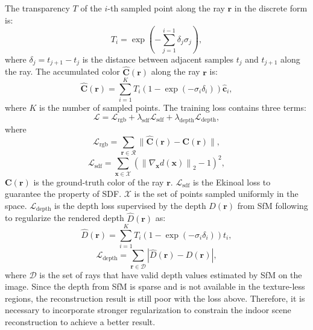 \documentclass[10pt,journal,compsoc]{IEEEtran}
\begin{document}
	The transparency $T$ of the $i$-th sampled point along the ray $\bm{r}$ in the discrete form is:
	\begin{equation}
		T_i = \exp(-\sum_{j=1}^{i-1} \delta_j\sigma_j),
	\end{equation}
	where $\delta_j=t_{j+1} - t_j$ is the distance between adjacent samples $t_{j}$ and $t_{j+1}$ along the ray.
	The accumulated color $\hat{\mathbf{C}}(\bm{r})$ along the ray $\bm{r}$ is:
	\begin{equation}
		\hat{\mathbf{C}}(\bm{r})=\sum_{i=1}^K T_i\left(1-\exp \left(-\sigma_i \delta_i\right)\right) \mathbf{\hat{c}}_i,
	\end{equation}
	where $K$ is the number of sampled points.
	The training loss contains three terms:
	\begin{equation}
		\mathcal{L} = \mathcal{L}_{\text{rgb}} + \lambda_{\text{sdf}}\mathcal{L}_{\text{sdf}} + \lambda_{\text{depth}}\mathcal{L}_{\text{depth}},
	\end{equation}
	where
	\begin{equation}
		\mathcal{L}_{\text{rgb}}=\sum_{\bm{r} \in \mathcal{R}}\|\hat{\mathbf{C}}(\bm{r})-\mathbf{C}(\bm{r})\|,
	\end{equation}
	\begin{equation}
		\mathcal{L}_{\text{sdf}}=\sum_{\bm{x} \in \mathcal{X}}\left(\left\|\nabla_{\bm{x}} d(\bm{x})\right\|_2-1\right)^2,
	\end{equation}
	$\mathbf{C}(\bm{r})$ is the ground-truth color of the ray $\bm{r}$. $\mathcal{L}_{\text{sdf}}$ is the Ekinoal loss \cite{yariv2020multiview,yariv2021volume} to guarantee the property of SDF. $\mathcal{X}$ is the set of points sampled uniformly in the space. $\mathcal{L}_{\text{depth}}$ is the depth loss supervised by the depth $D(\bm{r})$ from SfM \cite{schonberger2016structure} following \cite{deng2022depth,roessle2022dense,guo2022neural} to regularize the rendered depth $\hat{D}(\bm{r})$ as:
	\begin{equation}
		\hat{D}(\bm{r})=\sum_{i=1}^K T_i\left(1-\exp \left(-\sigma_i \delta_i\right)\right) t_i,
		\label{eq:depth}
	\end{equation}
	\begin{equation}
		\mathcal{L}_\text{depth}=\sum_{\bm{r} \in \mathcal{D}}|\hat{D}(\bm{r})-D(\bm{r})|,
	\end{equation}
	where $\mathcal{D}$ is the set of rays that have valid depth values estimated by SfM\cite{schonberger2016structure} on the image. Since the depth from SfM is sparse and is not available in the texture-less regions, the reconstruction result is still poor with the loss above. Therefore, it is necessary to incorporate stronger regularization to constrain the indoor scene reconstruction to achieve a better result.
	
\end{document}
